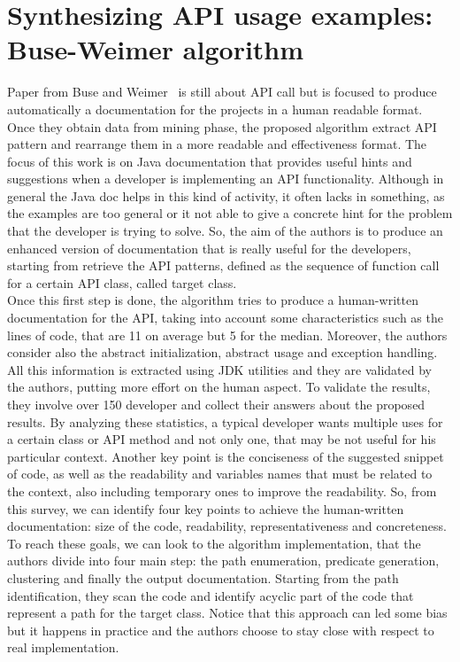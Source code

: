 \section{Synthesizing API usage examples: Buse-Weimer algorithm}
Paper from Buse and Weimer~\cite{buse_synthesizing_2012} is still about API call but is focused to produce automatically a documentation for the projects in a human readable format.
Once they obtain data from mining phase, the proposed algorithm extract API pattern and rearrange them in a more readable and effectiveness format. The focus of this work is on Java documentation that provides useful hints and suggestions when a developer is implementing an API functionality. Although in general the Java doc helps in this kind of activity, it often lacks in something, as the examples are too general or it not able to give a concrete hint for the problem that the developer is trying to solve. So, the aim of the authors is to produce an enhanced version of documentation that is really useful for the developers, starting from retrieve the API patterns, defined as the sequence of function call for a certain API class, called target class. \\
Once this first step is done, the algorithm tries to produce a human-written documentation for the API, taking into account some characteristics such as the lines of code, that are 11 on average but 5 for the median. Moreover, the authors consider also the abstract initialization, abstract usage and exception handling. All this information is extracted using JDK utilities and they are validated by the authors, putting more effort on the human aspect. To validate the results, they involve over 150 developer and collect their answers about the proposed results. By analyzing these statistics, a typical developer wants multiple uses for a certain class or API method and not only one, that may be not useful for his particular context. Another key point is the conciseness of the suggested snippet of code, as well as the readability and variables names that must be related to the context, also including temporary ones to improve the readability. So, from this survey, we can identify four key points to achieve the human-written documentation: size of the code, readability, representativeness and concreteness.\newline
To reach these goals, we can look to the algorithm implementation, that the authors divide into four main step: the path enumeration, predicate generation, clustering and finally the output documentation. Starting from the path identification, they scan the code and identify acyclic part of the code that represent a path for the target class. Notice that this approach can led some bias but it happens in practice and the authors choose to stay close with respect to real implementation. \\
